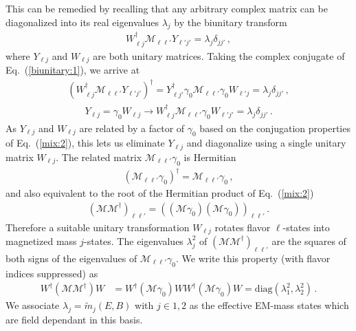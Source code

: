 \documentclass{ws-ijmpa}
\newcommand{\req}[1]{Eq.~(\ref{#1})}
\begin{document}
This can be remedied by recalling that any arbitrary complex matrix can be diagonalized into its real eigenvalues $\lambda_{j}$ by the biunitary transform
\begin{align}
\label{biunitary:1}
W_{\ell j}^{\dag}\mathcal{M}_{\ell\ell'}Y_{\ell'j'}=\lambda_{j}\delta_{jj'}\,,
\end{align}
where $Y_{\ell j}$ and $W_{\ell j}$ are both unitary matrices. Taking the complex conjugate of \req{biunitary:1}, we arrive at
\begin{align}
\label{biunitary:2}
(W_{\ell j}^{\dag}\mathcal{M}_{\ell\ell'}Y_{\ell'j'})^{\dag} = 
Y_{\ell j'}^{\dag}\gamma_{0}\mathcal{M}_{\ell\ell'}\gamma_{0}W_{\ell' j}=\lambda_{j}\delta_{jj'}\,,
\end{align}
%
\begin{align}
Y_{\ell j}=\gamma_{0}W_{\ell j}\rightarrow
W_{\ell j}^{\dag}\mathcal{M}_{\ell\ell'}\gamma_{0}W_{\ell'j'}=\lambda_{j}\delta_{jj'}\,. 
\end{align}
As $Y_{\ell j}$ and $W_{\ell j}$ are related by a factor of $\gamma_{0}$ based on the conjugation properties of \req{mix:2}, this lets us eliminate $Y_{\ell j}$ and diagonalize using a single unitary matrix $W_{\ell j}$. The related matrix $\mathcal{M}_{\ell\ell'}\gamma_{0}$ is Hermitian
\begin{align}
\label{herm:1}
(\mathcal{M}_{\ell\ell'}\gamma_{0})^{\dag} = \mathcal{M}_{\ell\ell'}\gamma_{0}\,,
\end{align}
and also equivalent to the root of the Hermitian product of \req{mix:2}
\begin{align}
(\mathcal{M}\mathcal{M}^{\dag})_{\ell\ell'} = \left((\mathcal{M}\gamma_{0})(\mathcal{M}\gamma_{0})\right)_{\ell\ell'}\,.
\end{align}
Therefore a suitable unitary transformation $W_{\ell j}$ rotates flavor $\ell$-states into magnetized mass $j$-states. The eigenvalues $\lambda_{j}^{2}$ of $(\mathcal{M}\mathcal{M}^{\dag})_{\ell\ell'}$ are the squares of both signs of the eigenvalues of $\mathcal{M}_{\ell\ell'}\gamma_{0}$. We write this property (with flavor indices suppressed) as
\begin{align}
W^{\dag}(\mathcal{M}\mathcal{M}^{\dag})W &= W^{\dag}(\mathcal{M}\gamma_{0})WW^{\dag}(\mathcal{M}\gamma_{0})W = \mathrm{diag}(\lambda_{1}^{2},\lambda_{2}^{2})\,.
\end{align}
We associate $\lambda_{j}=\widetilde m_{j}(E,B)$ with $j\in1,2$ as the effective EM-mass states which are field dependant in this basis. 
\end{document}
